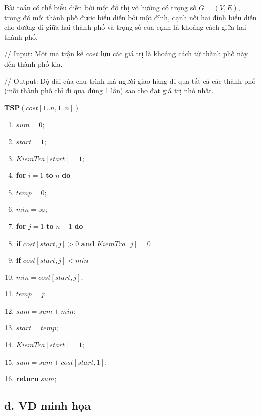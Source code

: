 \documentclass[12pt, a4paper, fleqn]{article}
\begin{document}
	Bài toán có thể biểu diễn bởi một đồ thị vô hướng có trọng số $G = (V, E)$, trong đó mỗi thành phố được biểu diễn bởi một đỉnh, cạnh nối hai đỉnh biểu diễn cho đường đi giữa hai thành phố và trọng số của cạnh là khoảng cách giữa hai thành phố.
	
	// Input: Một ma trận kề $cost$ lưu các giá trị là khoảng cách từ thành phố này đến thành phố kia.
	
	// Output: Độ dài của chu trình mà người giao hàng đi qua tất cả các thành phố (mỗi thành phố chỉ đi qua đúng 1 lần) sao cho đạt giá trị nhỏ nhất.
	
	\textbf{TSP}$(cost[1..n, 1..n])$
	\begin{enumerate}
		\item $sum = 0$;
		\item $start = 1$;
		\item $KiemTra[start] = 1$;
		\item \textbf{for} $i = 1$ \textbf{to} $n$ \textbf{do}
		\item \qquad $temp = 0$;
		\item \qquad $min = \infty$;
		\item \qquad \textbf{for} $j = 1$ \textbf{to} $n - 1$ \textbf{do}
		\item \qquad \qquad \textbf{if} $cost[start, j] > 0$ \textbf{and} $KiemTra[j] = 0$
		\item \qquad \qquad \qquad \textbf{if} $cost[start, j] < min$
		\item \qquad \qquad\qquad \qquad $min = cost[start, j]$;
		\item \qquad \qquad\qquad \qquad $temp = j$;
		\item \qquad $sum = sum + min$;
		\item \qquad $start = temp$;
		\item \qquad $KiemTra[start] = 1$;
		\item $sum = sum + cost[start, 1]$;
		\item \textbf{return} $sum$;
	\end{enumerate}
	
	\subsection*{d. VD minh họa}
	
\end{document}
